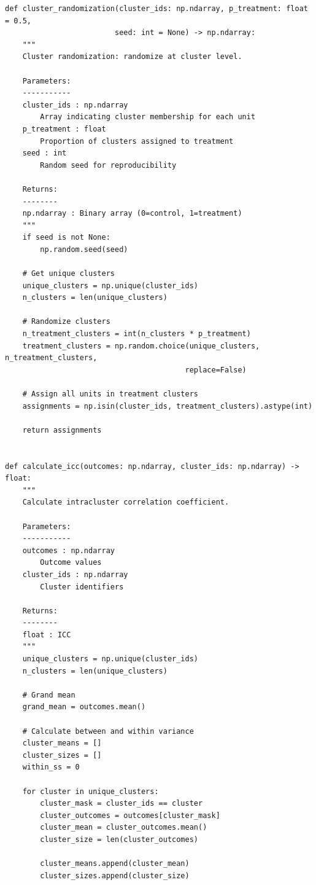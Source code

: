 \lstset{language=Python, caption=Cluster Randomization Implementation, label=lst:cluster_random}
\begin{lstlisting}
def cluster_randomization(cluster_ids: np.ndarray, p_treatment: float = 0.5,
                         seed: int = None) -> np.ndarray:
    """
    Cluster randomization: randomize at cluster level.

    Parameters:
    -----------
    cluster_ids : np.ndarray
        Array indicating cluster membership for each unit
    p_treatment : float
        Proportion of clusters assigned to treatment
    seed : int
        Random seed for reproducibility

    Returns:
    --------
    np.ndarray : Binary array (0=control, 1=treatment)
    """
    if seed is not None:
        np.random.seed(seed)

    # Get unique clusters
    unique_clusters = np.unique(cluster_ids)
    n_clusters = len(unique_clusters)

    # Randomize clusters
    n_treatment_clusters = int(n_clusters * p_treatment)
    treatment_clusters = np.random.choice(unique_clusters, n_treatment_clusters,
                                         replace=False)

    # Assign all units in treatment clusters
    assignments = np.isin(cluster_ids, treatment_clusters).astype(int)

    return assignments


def calculate_icc(outcomes: np.ndarray, cluster_ids: np.ndarray) -> float:
    """
    Calculate intracluster correlation coefficient.

    Parameters:
    -----------
    outcomes : np.ndarray
        Outcome values
    cluster_ids : np.ndarray
        Cluster identifiers

    Returns:
    --------
    float : ICC
    """
    unique_clusters = np.unique(cluster_ids)
    n_clusters = len(unique_clusters)

    # Grand mean
    grand_mean = outcomes.mean()

    # Calculate between and within variance
    cluster_means = []
    cluster_sizes = []
    within_ss = 0

    for cluster in unique_clusters:
        cluster_mask = cluster_ids == cluster
        cluster_outcomes = outcomes[cluster_mask]
        cluster_mean = cluster_outcomes.mean()
        cluster_size = len(cluster_outcomes)

        cluster_means.append(cluster_mean)
        cluster_sizes.append(cluster_size)


\end{lstlisting}
